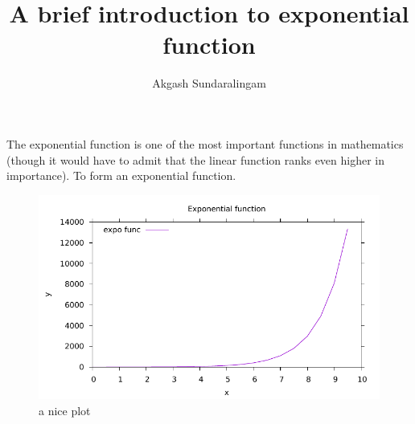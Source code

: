 \documentclass{article}
\title{A brief introduction to exponential function}
\author{Akgash Sundaralingam}
\date{}
\begin{document}
\maketitle
The exponential function is one of the most important functions in mathematics (though it would have to admit that the linear function ranks even higher in importance). To form an exponential function.
\begin{figure}[h]
    \centering
    \includegraphics[width=\textwidth]{exp1.pdf}
    \caption{a nice plot}
\end{figure}
\end{document}
